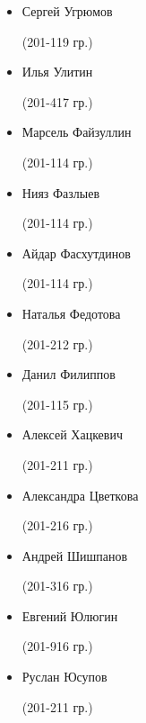 \begin{multicols}{2}
\begin{small}
\begin{itemize}[leftmargin=*]
	\item[] Сергей Угрюмов\begin{tiny} (201-119 гр.)\end{tiny}
	\item[] Илья Улитин\begin{tiny} (201-417 гр.)\end{tiny}

	\item[] Марсель Файзуллин\begin{tiny} (201-114 гр.)\end{tiny}
	\item[] Нияз Фазлыев\begin{tiny} (201-114 гр.)\end{tiny} %
	\item[] Айдар Фасхутдинов\begin{tiny} (201-114 гр.)\end{tiny} %
	\item[] Наталья Федотова\begin{tiny} (201-212 гр.)\end{tiny}
	\item[] Данил Филиппов\begin{tiny} (201-115 гр.)\end{tiny}

	\item[] Алексей Хацкевич\begin{tiny} (201-211 гр.)\end{tiny}

	\item[] Александра Цветкова\begin{tiny} (201-216 гр.)\end{tiny}

	\item[] Андрей Шишпанов\begin{tiny} (201-316 гр.)\end{tiny} %

	\item[] Евгений Юлюгин\begin{tiny} (201-916 гр.)\end{tiny}
	\item[] Руслан Юсупов\begin{tiny} (201-211 гр.)\end{tiny}
\end{itemize}
\end{small}
\end{multicols}